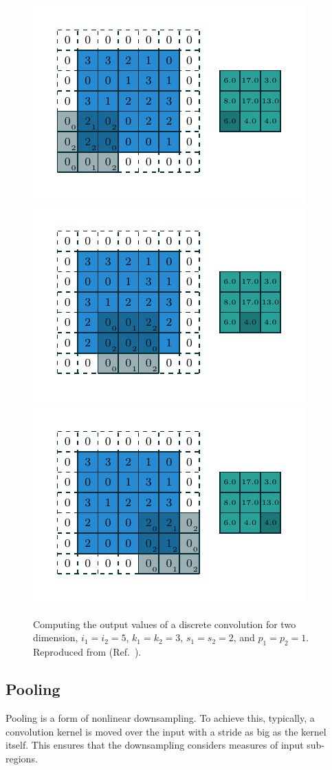 \begin{figure}
    \includegraphics[width=0.32\linewidth]{ANN/images/numerical_padding_strides_06.pdf}
    \includegraphics[width=0.32\linewidth]{ANN/images/numerical_padding_strides_07.pdf}
    \includegraphics[width=0.32\linewidth]{ANN/images/numerical_padding_strides_08.pdf}
    \caption{Computing the output values
        of a discrete convolution for two dimension, $i_1 = i_2 = 5$, $k_1 = k_2 = 3$,
        $s_1 = s_2 = 2$, and $p_1 = p_2 = 1$.
        Reproduced from  (Ref.~\cite{Dumoulin2016}).
    }
    \label{fig:numerical_padding_strides}
\end{figure}


\subsection{Pooling}\label{sec:pooling}
Pooling is a form of nonlinear downsampling.
To achieve this, typically, a convolution kernel is moved over the input with a stride as big as the kernel itself.
This ensures that the downsampling considers measures of input sub-regions.

